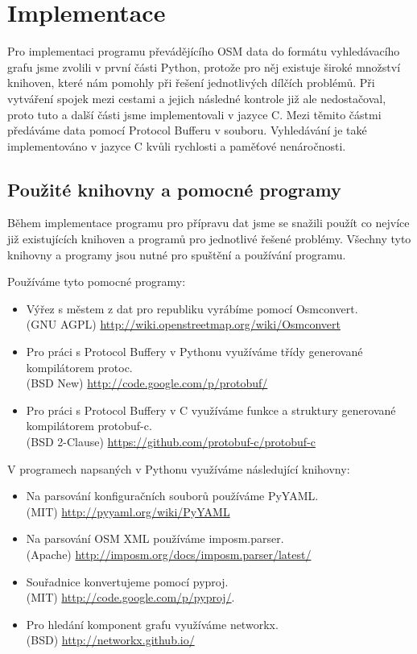 \chapter{Implementace}
Pro implementaci programu převádějícího OSM data do formátu vyhledávacího grafu
jsme zvolili v první části Python, protože pro něj existuje široké množství
knihoven, které nám pomohly při řešení jednotlivých dílčích problémů. Při
vytváření spojek mezi cestami a jejich následné kontrole již ale nedostačoval,
proto tuto a další části jsme implementovali v jazyce C. Mezi těmito částmi
předáváme data pomocí Protocol Bufferu v souboru. Vyhledávání je také
implementováno v jazyce C kvůli rychlosti a paměťové nenáročnosti.

\section{Použité knihovny a pomocné programy}
Během implementace programu pro přípravu dat jsme se snažili použít co nejvíce
již existujících knihoven a programů pro jednotlivé řešené problémy. Všechny
tyto knihovny a programy jsou nutné pro spuštění a používání programu. 

\medskip
\noindent Používáme tyto pomocné programy:
\begin{itemize}
	\item Výřez s městem z dat pro republiku vyrábíme pomocí {\tuc Osmconvert}.\\
	(GNU AGPL) \url{http://wiki.openstreetmap.org/wiki/Osmconvert}
	\item Pro práci s Protocol Buffery v Pythonu využíváme třídy generované
	kompilátorem {\tuc protoc}.\\
	(BSD New) \url{http://code.google.com/p/protobuf/}
	\item Pro práci s Protocol Buffery v C využíváme funkce a struktury
	generované kompilátorem {\tuc protobuf-c}.\\
	(BSD 2-Clause) \url{https://github.com/protobuf-c/protobuf-c}
\end{itemize}

\noindent V programech napsaných v Pythonu využíváme následující knihovny:
\begin{itemize}
	\item Na parsování konfiguračních souborů používáme {\tuc PyYAML}.\\
	(MIT) \url{http://pyyaml.org/wiki/PyYAML}
	\item Na parsování OSM XML používáme {\tuc imposm.parser}.\\
	(Apache) \url{http://imposm.org/docs/imposm.parser/latest/}
	\item Souřadnice konvertujeme pomocí {\tuc pyproj}.\\
	(MIT) \url{http://code.google.com/p/pyproj/}.
	\item Pro hledání komponent grafu využíváme {\tuc networkx}.\\
	(BSD) \url{http://networkx.github.io/}
\end{itemize}

